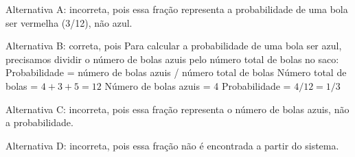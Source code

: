 Alternativa A: incorreta, pois essa fração representa a probabilidade de
uma bola ser vermelha (3/12), não azul.

Alternativa B: correta, pois Para calcular a probabilidade de uma bola
ser azul, precisamos dividir o número de bolas azuis pelo número total
de bolas no saco: Probabilidade = número de bolas azuis / número total
de bolas Número total de bolas = $4 + 3 + 5 = 12$ Número de bolas azuis =
4 Probabilidade = $4/12 = 1/3$

Alternativa C: incorreta, pois essa fração representa o número de bolas
azuis, não a probabilidade.

Alternativa D: incorreta, pois essa fração não é encontrada a partir do
sistema.
